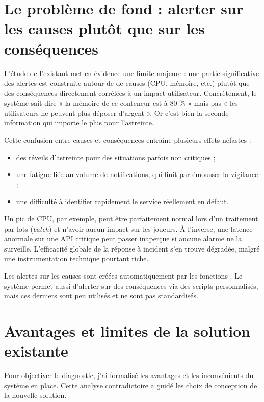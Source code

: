 \section{Le problème de fond : alerter sur les causes plutôt que sur les conséquences}

L'étude de l'existant met en évidence une limite majeure : une partie significative des alertes est
construite autour de  de causes (CPU, mémoire, etc.) plutôt que des conséquences directement
corrélées à un impact utilisateur. Concrètement, le système sait dire « la mémoire de ce conteneur est
à 80 \% » mais pas « les utilisateurs ne peuvent plus déposer d'argent ». Or c'est bien la seconde
information qui importe le plus pour l'astreinte.

Cette confusion entre causes et conséquences entraîne plusieurs effets néfastes :

\begin{itemize}
	\item des réveils d'astreinte pour des situations parfois non critiques ;
	\item une fatigue liée au volume de notifications, qui finit par émousser la vigilance ;
	\item une difficulté à identifier rapidement le service réellement en défaut.
\end{itemize}

Un pic de CPU, par exemple, peut être parfaitement normal lors d'un traitement par lots (\emph{batch})
et n'avoir aucun impact sur les joueurs. À l'inverse, une latence anormale sur une API critique peut passer inaperçue si
aucune alarme ne la surveille. L'efficacité globale de la réponse à incident s'en trouve dégradée,
malgré une instrumentation technique pourtant riche.

Les alertes sur les causes sont créées automatiquement par les fonctions . 
Le système permet aussi d'alerter sur des conséquences via des scripts personnalisés, mais ces derniers sont peu utilisés et ne sont pas standardisés. 

\section{Avantages et limites de la solution existante}

Pour objectiver le diagnostic, j'ai formalisé les avantages et les inconvénients du système en place.
Cette analyse contradictoire a guidé les choix de conception de la nouvelle solution.

